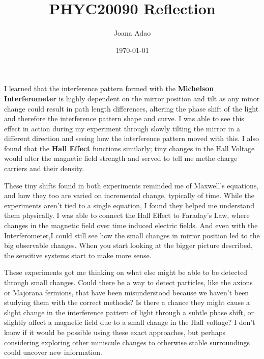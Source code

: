 \documentclass[12pt]{article}
\title{PHYC20090 Reflection}
\author{Joana Adao}
\date{\today}
\begin{document}
\thispagestyle{empty}

I learned that the interference pattern formed with the \textbf{Michelson Interferometer} is highly dependent on the mirror position and tilt as any minor change could result in path length differences, altering the phase
shift of the light and therefore the interference pattern shape and curve. I was able to see this effect in action during my experiment through slowly tilting the mirror in a different direction and seeing how the interference pattern
moved with this. I also found that the \textbf{Hall Effect} functions  similarly; tiny changes in the Hall Voltage would alter the magnetic field strength and served to tell me methe charge carriers and their density.

These tiny shifts found in both experiments reminded me of Maxwell's equations, and how they too are varied on incremental change, typically of time. While the experiments aren't tied to a single equation,
I found they helped me understand them physically. I was able to connect the Hall Effect to Faraday's Law, where changes in the magnetic field over time induced electric fields. 
And even with the Interferometer,I could still see how the small changes in mirror position led to the big observable changes. When you start looking at the bigger picture described, the sensitive systems start to make more sense.

These experiments got me thinking on what else might be able to be detected through small changes. 
Could there be a way to detect particles, like the axions or Majorana fermions, that have been misunderstood because we haven't been studying them with the correct methods?
Is there a chance they might cause a slight change in the interference pattern of light through a subtle phase shift, or slightly affect a magnetic field due to a small change in the Hall voltage?
I don't know if it would be possible using these exact approaches, but perhaps considering exploring other miniscule changes to otherwise stable surroundings could uncover new information.
\end{document}
